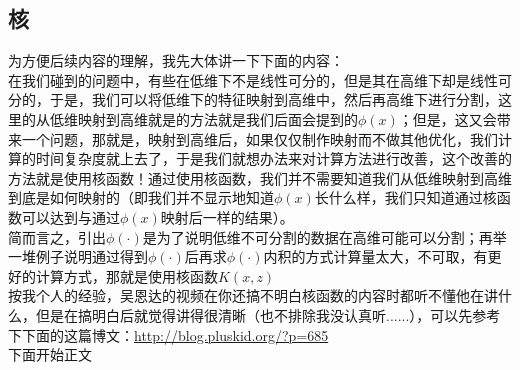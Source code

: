 \subsection{核}
为方便后续内容的理解，我先大体讲一下下面的内容： \\

在我们碰到的问题中，有些在低维下不是线性可分的，但是其在高维下却是线性可分的，于是，我们可以将低维下的特征映射到高维中，然后再高维下进行分割，这里的从低维映射到高维就是的方法就是我们后面会提到的$\phi(x)$；但是，这又会带来一个问题，那就是，映射到高维后，如果仅仅制作映射而不做其他优化，我们计算的时间复杂度就上去了，于是我们就想办法来对计算方法进行改善，这个改善的方法就是使用核函数！通过使用核函数，我们并不需要知道我们从低维映射到高维到底是如何映射的（即我们并不显示地知道$\phi(x)$长什么样，我们只知道通过核函数可以达到与通过$\phi(x)$映射后一样的结果）。 \\

简而言之，引出$\phi(\cdot)$是为了说明低维不可分割的数据在高维可能可以分割；再举一堆例子说明通过得到$\phi(\cdot)$后再求$\phi(\cdot)$内积的方式计算量太大，不可取，有更好的计算方式，那就是使用核函数$K(x, z)$\\

按我个人的经验，吴恩达的视频在你还搞不明白核函数的内容时都听不懂他在讲什么，但是在搞明白后就觉得讲得很清晰（也不排除我没认真听......），可以先参考下下面的这篇博文：\url{http://blog.pluskid.org/?p=685} \\

下面开始正文


